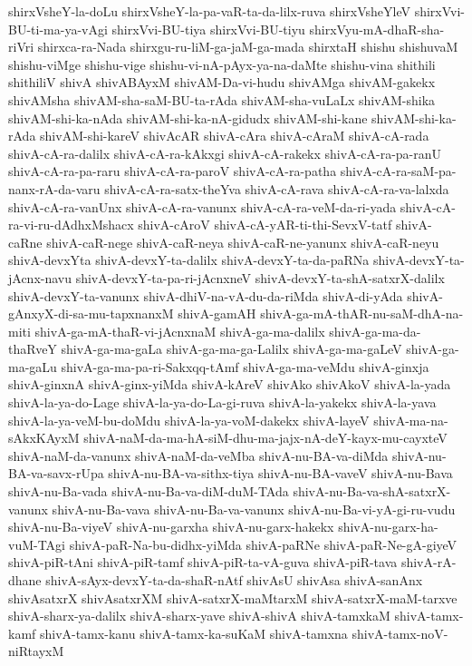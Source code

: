 {shirxVsheY-la-doLu
shirxVsheY-la-pa-vaR-ta-da-lilx-ruva
shirxVsheYleV
shirxVvi-BU-ti-ma-ya-vAgi
shirxVvi-BU-tiya
shirxVvi-BU-tiyu
shirxVyu-mA-dhaR-sha-riVri
shirxca-ra-Nada
shirxgu-ru-liM-ga-jaM-ga-mada
shirxtaH
shishu
shishuvaM
shishu-viMge
shishu-vige
shishu-vi-nA-pAyx-ya-na-daMte
shishu-vina
shithili
shithiliV
shivA
shivABAyxM
shivAM-Da-vi-hudu
shivAMga
shivAM-gakekx
shivAMsha
shivAM-sha-saM-BU-ta-rAda
shivAM-sha-vuLaLx
shivAM-shika
shivAM-shi-ka-nAda
shivAM-shi-ka-nA-gidudx
shivAM-shi-kane
shivAM-shi-ka-rAda
shivAM-shi-kareV
shivAcAR
shivA-cAra
shivA-cAraM
shivA-cA-rada
shivA-cA-ra-dalilx
shivA-cA-ra-kAkxgi
shivA-cA-rakekx
shivA-cA-ra-pa-ranU
shivA-cA-ra-pa-raru
shivA-cA-ra-paroV
shivA-cA-ra-patha
shivA-cA-ra-saM-pa-nanx-rA-da-varu
shivA-cA-ra-satx-theYva
shivA-cA-rava
shivA-cA-ra-va-lalxda
shivA-cA-ra-vanUnx
shivA-cA-ra-vanunx
shivA-cA-ra-veM-da-ri-yada
shivA-cA-ra-vi-ru-dAdhxMshacx
shivA-cAroV
shivA-cA-yAR-ti-thi-SevxV-tatf
shivA-caRne
shivA-caR-nege
shivA-caR-neya
shivA-caR-ne-yanunx
shivA-caR-neyu
shivA-devxYta
shivA-devxY-ta-dalilx
shivA-devxY-ta-da-paRNa
shivA-devxY-ta-jAcnx-navu
shivA-devxY-ta-pa-ri-jAcnxneV
shivA-devxY-ta-shA-satxrX-dalilx
shivA-devxY-ta-vanunx
shivA-dhiV-na-vA-du-da-riMda
shivA-di-yAda
shivA-gAnxyX-di-sa-mu-tapxnanxM
shivA-gamAH
shivA-ga-mA-thAR-nu-saM-dhA-na-miti
shivA-ga-mA-thaR-vi-jAcnxnaM
shivA-ga-ma-dalilx
shivA-ga-ma-da-thaRveY
shivA-ga-ma-gaLa
shivA-ga-ma-ga-Lalilx
shivA-ga-ma-gaLeV
shivA-ga-ma-gaLu
shivA-ga-ma-pa-ri-Sakxqq-tAmf
shivA-ga-ma-veMdu
shivA-ginxja
shivA-ginxnA
shivA-ginx-yiMda
shivA-kAreV
shivAko
shivAkoV
shivA-la-yada
shivA-la-ya-do-Lage
shivA-la-ya-do-La-gi-ruva
shivA-la-yakekx
shivA-la-yava
shivA-la-ya-veM-bu-doMdu
shivA-la-ya-voM-dakekx
shivA-layeV
shivA-ma-na-sAkxKAyxM
shivA-naM-da-ma-hA-siM-dhu-ma-jajx-nA-deY-kayx-mu-cayxteV
shivA-naM-da-vanunx
shivA-naM-da-veMba
shivA-nu-BA-va-diMda
shivA-nu-BA-va-savx-rUpa
shivA-nu-BA-va-sithx-tiya
shivA-nu-BA-vaveV
shivA-nu-Bava
shivA-nu-Ba-vada
shivA-nu-Ba-va-diM-duM-TAda
shivA-nu-Ba-va-shA-satxrX-vanunx
shivA-nu-Ba-vava
shivA-nu-Ba-va-vanunx
shivA-nu-Ba-vi-yA-gi-ru-vudu
shivA-nu-Ba-viyeV
shivA-nu-garxha
shivA-nu-garx-hakekx
shivA-nu-garx-ha-vuM-TAgi
shivA-paR-Na-bu-didhx-yiMda
shivA-paRNe
shivA-paR-Ne-gA-giyeV
shivA-piR-tAni
shivA-piR-tamf
shivA-piR-ta-vA-guva
shivA-piR-tava
shivA-rA-dhane
shivA-sAyx-devxY-ta-da-shaR-nAtf
shivAsU
shivAsa
shivA-sanAnx
shivAsatxrX
shivAsatxrXM
shivA-satxrX-maMtarxM
shivA-satxrX-maM-tarxve
shivA-sharx-ya-dalilx
shivA-sharx-yave
shivA-shivA
shivA-tamxkaM
shivA-tamx-kamf
shivA-tamx-kanu
shivA-tamx-ka-suKaM
shivA-tamxna
shivA-tamx-noV-niRtayxM
}
